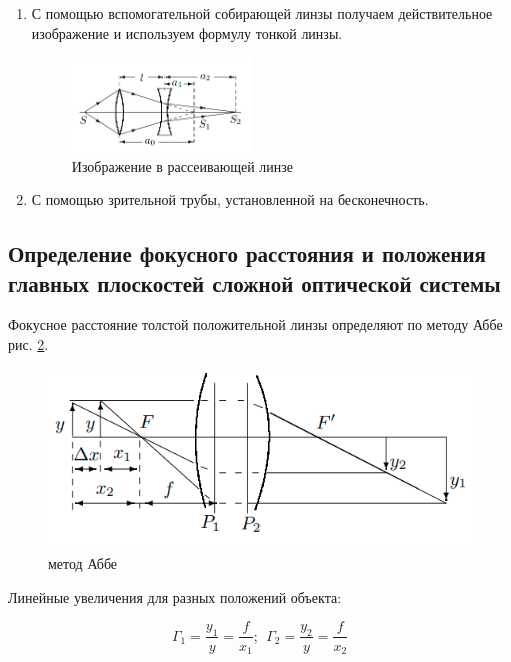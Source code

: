 	\begin{enumerate}
		\item С помощью вспомогательной собирающей линзы получаем действительное изображение и используем формулу тонкой линзы.
		
		\begin{figure}
			\centering
			\includegraphics[width = 0.45\textwidth]{images/image_in_negative_lense.png}
			\caption{Изображение в рассеивающей линзе}
			\label{fig:image_in_negative_lense.png}
		\end{figure}
	
		\item С помощью зрительной трубы, установленной на бесконечность.
	\end{enumerate}

	\subsection*{Определение фокусного расстояния и положения главных плоскостей сложной оптической системы}
	
	Фокусное расстояние толстой положительной линзы определяют по методу Аббе рис. \ref{fig:Abbe_method}.
	
	\begin{figure}
		\centering
		\includegraphics[scale=0.5]{images/Abbe_method.png}
		\caption{метод Аббе}
		\label{fig:Abbe_method}
	\end{figure}

	Линейные увеличения для разных положений объекта:
	
	\[ \Gamma_1 = \frac{y_1}{y} = \frac{f}{x_1}; ~~ \Gamma_2 = \frac{y_2}{y} = \frac{f}{x_2} \]
	
